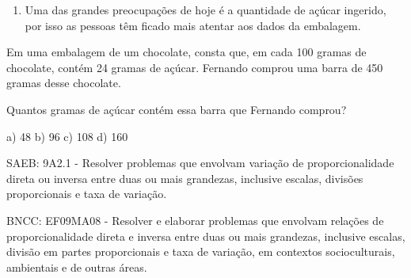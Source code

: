 \begin{escolha}
\begin{boxmedio}
\begin{boxmedio}
{\begin{boxpeq}
\begin{boxpeq}
{\begin{boxpeq}
\begin{boxmedio}
\begin{boxmedio}
\begin{boxpeq}
\begin{boxmedio}
\begin{boxpeq}
\begin{boxpeq}
\begin{boxpeq}
\begin{boxpeq}
\begin{boxmedio}
{\begin{boxmedio}
\begin{boxmedio}
\begin{boxpeq}
\begin{boxmedio}
\begin{boxpeq}
\begin{boxpeq}
\begin{boxpeq}
\begin{escolha}
{\begin{boxmedio}
\begin{boxpeq}
\begin{boxpeq}
\begin{boxpeq}
\begin{boxpeq}
\begin{boxpeq}
\begin{boxmedio}
\begin{boxpeq}
\begin{boxpeq}
\begin{boxpeq}
{\begin{boxpeq}
\begin{boxmedio}
\begin{boxpeq}
\begin{boxpeq}
\begin{boxpeq}
{\begin{boxpeq}
\begin{boxmedio}
{\begin{boxpeq}
\begin{boxpeq}
\begin{boxmedio}
\begin{boxmedio}
\begin{boxpeq}
\begin{boxpeq}
{\begin{boxpeq}
\begin{boxpeq}
\begin{boxpeq}
\begin{boxpeq}
\begin{boxpeq}
\begin{escolha}
\begin{escolha}
{\begin{boxmedio}
\begin{boxpeq}
\begin{q°}
\begin{boxmedio}
\begin{boxpeq}
\begin{boxpeq}
\begin{boxmedio}
\begin{boxmedio}
\begin{boxmedio}
\begin{boxmedio}
{\begin{escolha}
\begin{escolha}
\begin{escolha}
\begin{escolha}
\begin{escolha}
\begin{escolha}
{\begin{enumerate}
\num{\arabic{enumi}.}
\setcounter{enumi}{7}
\tightlist
\item
  Uma das grandes preocupações de hoje é a quantidade de açúcar
  ingerido, por isso as pessoas têm ficado mais atentar aos dados da
  embalagem.
\end{enumerate}

Em uma embalagem de um chocolate, consta que, em cada 100 gramas de
chocolate, contém 24 gramas de açúcar. Fernando comprou uma barra de 450
gramas desse chocolate.

Quantos gramas de açúcar contém essa barra que Fernando comprou?

a) 48 b) 96 c) 108 d) 160

SAEB: 9A2.1 - Resolver problemas que envolvam variação de
proporcionalidade direta ou inversa entre duas ou mais grandezas,
inclusive escalas, divisões proporcionais e taxa de variação.

BNCC: EF09MA08 - Resolver e elaborar problemas que envolvam relações de
proporcionalidade direta e inversa entre duas ou mais grandezas,
inclusive escalas, divisão em partes proporcionais e taxa de variação,
em contextos socioculturais, ambientais e de outras áreas.

}
\end{escolha}
\end{escolha}
\end{escolha}
\end{escolha}
\end{escolha}
\end{escolha}}
\end{boxmedio}
\end{boxmedio}
\end{boxmedio}
\end{boxmedio}
\end{boxpeq}
\end{boxpeq}
\end{boxmedio}
\end{q°}
\end{boxpeq}
\end{boxmedio}}
\end{escolha}
\end{escolha}
\end{boxpeq}
\end{boxpeq}
\end{boxpeq}
\end{boxpeq}
\end{boxpeq}}
\end{boxpeq}
\end{boxpeq}
\end{boxmedio}
\end{boxmedio}
\end{boxpeq}
\end{boxpeq}}
\end{boxmedio}
\end{boxpeq}}
\end{boxpeq}
\end{boxpeq}
\end{boxpeq}
\end{boxmedio}
\end{boxpeq}}
\end{boxpeq}
\end{boxpeq}
\end{boxpeq}
\end{boxmedio}
\end{boxpeq}
\end{boxpeq}
\end{boxpeq}
\end{boxpeq}
\end{boxpeq}
\end{boxmedio}}
\end{escolha}
\end{boxpeq}
\end{boxpeq}
\end{boxpeq}
\end{boxmedio}
\end{boxpeq}
\end{boxmedio}
\end{boxmedio}}
\end{boxmedio}
\end{boxpeq}
\end{boxpeq}
\end{boxpeq}
\end{boxpeq}
\end{boxmedio}
\end{boxpeq}
\end{boxmedio}
\end{boxmedio}
\end{boxpeq}}
\end{boxpeq}
\end{boxpeq}}
\end{boxmedio}
\end{boxmedio}
\end{escolha}
